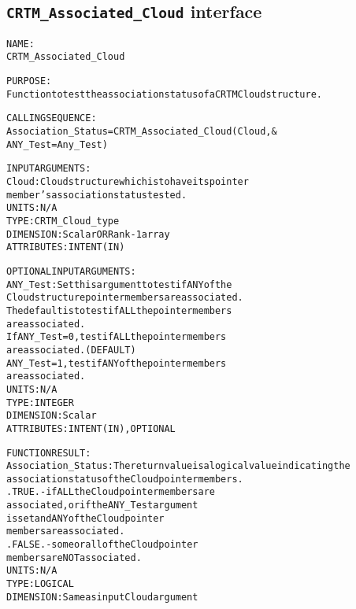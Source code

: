 \subsection{\texttt{CRTM\_Associated\_Cloud} interface}
  \label{sec:CRTM_Associated_Cloud_interface}
  \begin{alltt}
 
  NAME:
        CRTM_Associated_Cloud
 
  PURPOSE:
        Function to test the association status of a CRTM Cloud structure.
 
  CALLING SEQUENCE:
        Association_Status = CRTM_Associated_Cloud( Cloud            , &
                                                    ANY_Test=Any_Test  )
 
  INPUT ARGUMENTS:
        Cloud:               Cloud structure which is to have its pointer
                             member's association status tested.
                             UNITS:      N/A
                             TYPE:       CRTM_Cloud_type
                             DIMENSION:  Scalar OR Rank-1 array
                             ATTRIBUTES: INTENT(IN)
 
  OPTIONAL INPUT ARGUMENTS:
        ANY_Test:            Set this argument to test if ANY of the
                             Cloud structure pointer members are associated.
                             The default is to test if ALL the pointer members
                             are associated.
                             If ANY_Test = 0, test if ALL the pointer members
                                              are associated.  (DEFAULT)
                                ANY_Test = 1, test if ANY of the pointer members
                                              are associated.
                             UNITS:      N/A
                             TYPE:       INTEGER
                             DIMENSION:  Scalar
                             ATTRIBUTES: INTENT(IN), OPTIONAL
 
  FUNCTION RESULT:
        Association_Status:  The return value is a logical value indicating the
                             association status of the Cloud pointer members.
                             .TRUE.  - if ALL the Cloud pointer members are
                                       associated, or if the ANY_Test argument
                                       is set and ANY of the Cloud pointer
                                       members are associated.
                             .FALSE. - some or all of the Cloud pointer
                                       members are NOT associated.
                             UNITS:      N/A
                             TYPE:       LOGICAL
                             DIMENSION:  Same as input Cloud argument
 
  \end{alltt}
